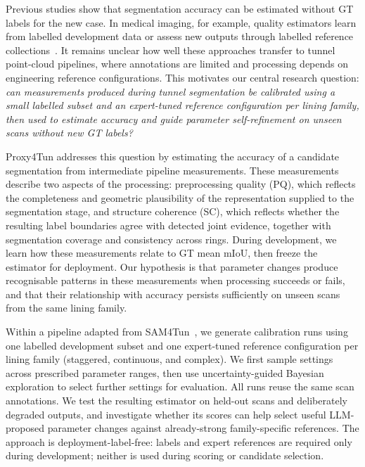 \documentclass[a4paper,fleqn]{cas-dc}
\begin{document}
{Previous studies show that segmentation accuracy can be estimated without GT labels for the new case. In medical imaging, for example, quality estimators learn from labelled development data or assess new outputs through labelled reference collections~\cite{valindria2017rca,robinson2018segmentationQuality,fournel2021segmentationQC}. It remains unclear how well these approaches transfer to tunnel point-cloud pipelines, where annotations are limited and processing depends on engineering reference configurations. This motivates our central research question: \emph{can measurements produced during tunnel segmentation be calibrated using a small labelled subset and an expert-tuned reference configuration per lining family, then used to estimate accuracy and guide parameter self-refinement on unseen scans without new GT labels?}

Proxy4Tun addresses this question by estimating the accuracy of a candidate segmentation from intermediate pipeline measurements. These measurements describe two aspects of the processing: preprocessing quality (PQ), which reflects the completeness and geometric plausibility of the representation supplied to the segmentation stage, and structure coherence (SC), which reflects whether the resulting label boundaries agree with detected joint evidence, together with segmentation coverage and consistency across rings. During development, we learn how these measurements relate to GT mean mIoU, then freeze the estimator for deployment. Our hypothesis is that parameter changes produce recognisable patterns in these measurements when processing succeeds or fails, and that their relationship with accuracy persists sufficiently on unseen scans from the same lining family.

Within a pipeline adapted from SAM4Tun~\cite{ye2025sam4tun}, we generate calibration runs using one labelled development subset and one expert-tuned reference configuration per lining family (staggered, continuous, and complex). We first sample settings across prescribed parameter ranges, then use uncertainty-guided Bayesian exploration to select further settings for evaluation. All runs reuse the same scan annotations. We test the resulting estimator on held-out scans and deliberately degraded outputs, and investigate whether its scores can help select useful LLM-proposed parameter changes against already-strong family-specific references. The approach is deployment-label-free: labels and expert references are required only during development; neither is used during scoring or candidate selection.

}
\end{document}
